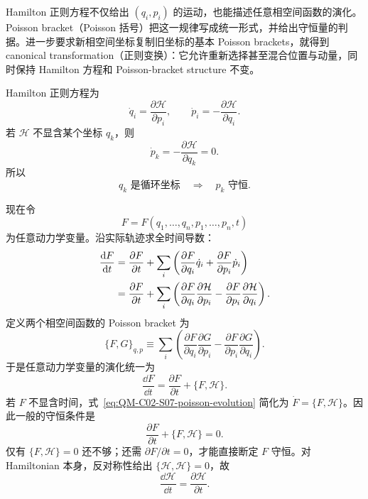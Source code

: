 Hamilton 正则方程不仅给出 $(q_i,p_i)$ 的运动，也能描述任意相空间函数的演化。Poisson bracket（Poisson 括号）把这一规律写成统一形式，并给出守恒量的判据。进一步要求新相空间坐标复制旧坐标的基本 Poisson brackets，就得到 canonical transformation（正则变换）：它允许重新选择甚至混合位置与动量，同时保持 Hamilton 方程和 Poisson-bracket structure 不变。


Hamilton 正则方程为
\begin{equation}
  \dot q_i=\frac{\partial\mathcal H}{\partial p_i},
  \qquad
  \dot p_i=-\frac{\partial\mathcal H}{\partial q_i}.
  \label{eq:QM-C02-S07-hamilton-equations}
\end{equation}
若 $\mathcal H$ 不显含某个坐标 $q_k$，则
\[
  \dot p_k=-\frac{\partial\mathcal H}{\partial q_k}=0.
\]
所以
\begin{equation}
  \boxed{
  q_k\text{ 是循环坐标}
  \quad\Longrightarrow\quad
  p_k\text{ 守恒}.}
  \label{eq:QM-C02-S07-cyclic-conservation}
\end{equation}

现在令
\[
  F=F(q_1,\ldots,q_n,p_1,\ldots,p_n,t)
\]
为任意动力学变量。沿实际轨迹求全时间导数：
\begin{align}
  \frac{\mathop{}\!\mathrm{d} F}{\mathop{}\!\mathrm{d} t}
  &=\frac{\partial F}{\partial t}
  +\sum_i\left(
    \frac{\partial F}{\partial q_i}\dot q_i
    +\frac{\partial F}{\partial p_i}\dot p_i
  \right) \notag\\
  &=\frac{\partial F}{\partial t}
  +\sum_i\left(
    \frac{\partial F}{\partial q_i}
    \frac{\partial\mathcal H}{\partial p_i}
    -
    \frac{\partial F}{\partial p_i}
    \frac{\partial\mathcal H}{\partial q_i}
  \right).
  \label{eq:QM-C02-S07-total-derivative}
\end{align}
定义两个相空间函数的 Poisson bracket 为
\begin{equation}
  \boxed{
  \{F,G\}_{q,p}
  \equiv
  \sum_i\left(
    \frac{\partial F}{\partial q_i}
    \frac{\partial G}{\partial p_i}
    -
    \frac{\partial F}{\partial p_i}
    \frac{\partial G}{\partial q_i}
  \right).}
  \label{eq:QM-C02-S07-poisson-definition}
\end{equation}
于是任意动力学变量的演化统一为
\begin{equation}
  \boxed{
  \frac{\dd F}{\dd t}
  =\frac{\partial F}{\partial t}
  +\{F,\mathcal H\}.}
  \label{eq:QM-C02-S07-poisson-evolution}
\end{equation}
若 $F$ 不显含时间，式~\eqref{eq:QM-C02-S07-poisson-evolution} 简化为 $\dot F=\{F,\mathcal H\}$。因此一般的守恒条件是
\begin{equation}
  \boxed{
  \frac{\partial F}{\partial t}
  +\{F,\mathcal H\}=0.}
  \label{eq:QM-C02-S07-conservation-general}
\end{equation}
仅有 $\{F,\mathcal H\}=0$ 还不够；还需 $\partial F/\partial t=0$，才能直接断定 $F$ 守恒。对 Hamiltonian 本身，反对称性给出 $\{\mathcal H,\mathcal H\}=0$，故
\begin{equation}
  \frac{\dd\mathcal H}{\dd t}
  =\frac{\partial\mathcal H}{\partial t}.
  \label{eq:QM-C02-S07-hamiltonian-time-dependence}
\end{equation}

